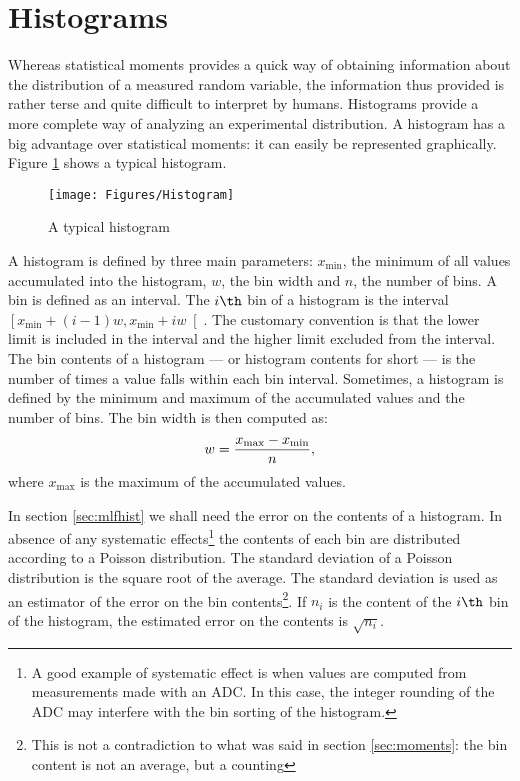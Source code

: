 \section{Histograms}
\label{sec:histogram} Whereas statistical moments provides a quick
way of obtaining information about the distribution of a measured
random variable, the information thus provided is rather terse and
quite difficult to interpret by humans.
Histograms provide a more complete way of analyzing an experimental distribution. A
histogram has a big advantage over statistical moments: it can
easily be represented graphically. Figure \ref{fig:histogram}
shows a typical histogram.
\begin{figure}
\centering\texttt{[image: Figures/Histogram]}
\caption{A typical histogram}\label{fig:histogram}
\end{figure}

A histogram is defined by three main parameters: $x_{\min}$, the
minimum of all values accumulated into the histogram, $w$, the bin
width and $n$, the number of bins. A bin is defined as an
interval. The $i\th$ bin of a histogram is the interval $\left[
x_{\min}+\left(i-1\right)w, x_{\min}+iw\right[$. The customary
convention is that the lower limit is included in the interval and
the higher limit excluded from the interval. The bin contents of a
histogram --- or histogram contents for short --- is the number of
times a value falls within each bin interval. Sometimes, a
histogram is defined by the minimum and maximum of the accumulated
values and the number of bins. The bin width is then computed as:
\begin{equation}
  w = {x_{\max} - x_{\min} \over n},
\end{equation}
where $x_{\max}$ is the maximum of the accumulated values.

In section \ref{sec:mlfhist} we shall need the error on the
contents of a histogram. In absence of any systematic
effects\footnote{A good example of systematic effect is when
values are computed from measurements made with an ADC. In this
case, the integer rounding of the ADC may interfere with the bin
sorting of the histogram.} the contents of each bin are
distributed according to a Poisson distribution. The standard
deviation of a Poisson distribution is the square root of the
average. The standard deviation is used as an estimator of the
error on the bin contents\footnote{This is not a contradiction to
what was said in section \ref{sec:moments}: the bin content is not
an average, but a counting}. If $n_i$ is the content of the $i\th$
bin of the histogram, the estimated error on the contents is
$\sqrt{n_i}$.

